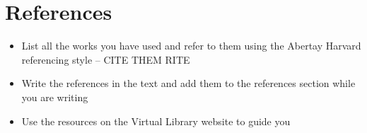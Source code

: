 \section{References}
\begin{itemize}
\item List all the works you have used and refer to them using the Abertay Harvard referencing style – CITE THEM RITE
\item Write the references in the text and add them to the references section while you are writing
\item Use the resources on the Virtual Library website to guide you
\end{itemize}